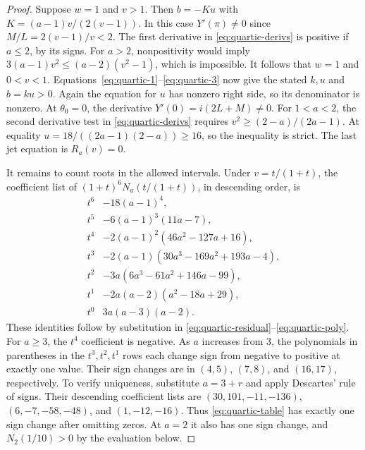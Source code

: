 \documentclass[11pt]{article}
\begin{document}
\begin{proof}
Suppose \(w=1\) and \(v>1\). Then \(b=-Ku\) with
\(K=(a-1)v/(2(v-1))\). In this case
\(Y'(\pi)\ne0\) since \(M/L=2(v-1)/v<2\).
The first derivative in \eqref{eq:quartic-derivs} is positive if
\(a\le2\), by its signs. For \(a>2\), nonpositivity would imply
\(3(a-1)v^2\le(a-2)(v^2-1)\), which is impossible.
It follows that \(w=1\) and \(0<v<1\).
Equations~\eqref{eq:quartic-1}--\eqref{eq:quartic-3} now give the
stated \(k,u\) and \(b=ku>0\). Again the equation for \(u\) has
nonzero right side, so its denominator is nonzero.
At \(\theta_0=0\), the derivative
\(Y'(0)=i(2L+M)\ne0\).
For \(1<a<2\), the second derivative test in
\eqref{eq:quartic-derivs} requires \(v^2\ge(2-a)/(2a-1)\).
At equality \(u=18/((2a-1)(2-a))\ge16\), so the inequality is strict.
The last jet equation is \(R_a(v)=0\).

It remains to count roots in the allowed intervals. Under
\(v=t/(1+t)\), the coefficient list of
\((1+t)^6N_a(t/(1+t))\), in descending order, is
\begin{equation}\label{eq:quartic-table}
 \begin{array}{ll}
 t^6&-18(a-1)^4,\\
 t^5&-6(a-1)^3(11a-7),\\
 t^4&-2(a-1)^2(46a^2-127a+16),\\
 t^3&-2(a-1)(30a^3-169a^2+193a-4),\\
 t^2&-3a(6a^3-61a^2+146a-99),\\
 t^1&-2a(a-2)(a^2-18a+29),\\
 t^0&3a(a-3)(a-2).
 \end{array}
\end{equation}
These identities follow by substitution in
\eqref{eq:quartic-residual}--\eqref{eq:quartic-poly}.
For \(a\ge3\), the \(t^4\) coefficient is negative. As \(a\)
increases from 3, the polynomials in parentheses in the
\(t^3,t^2,t^1\) rows each change sign from negative to positive
at exactly one value. Their sign changes are in \((4,5)\),
\((7,8)\), and \((16,17)\), respectively. To verify uniqueness,
substitute \(a=3+r\) and apply Descartes' rule of signs.
Their descending coefficient lists are
\((30,101,-11,-136)\), \((6,-7,-58,-48)\), and \((1,-12,-16)\).
Thus \eqref{eq:quartic-table} has exactly one sign change
after omitting zeros. At \(a=2\) it also has one sign change,
and \(N_2(1/10)>0\) by the evaluation below.


\end{proof}
\end{document}
